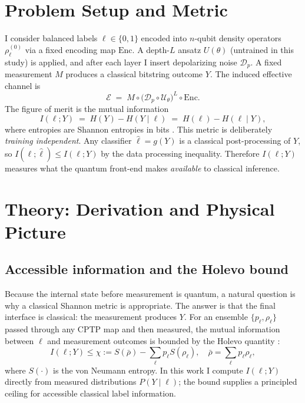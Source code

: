\documentclass[journal]{IEEEtran}
\newcommand{\MI}{I(\ell;Y)}
\begin{document}
\section{Problem Setup and Metric}
I consider balanced labels $\ell\in\{0,1\}$ encoded into $n$-qubit density operators $\rho_\ell^{(0)}$ via a fixed encoding map $\mathrm{Enc}$. A depth-$L$ ansatz $U(\theta)$ (untrained in this study) is applied, and after each layer I insert depolarizing noise $\mathcal{D}_p$. A fixed measurement $M$ produces a classical bitstring outcome $Y$. The induced effective channel is
\begin{equation}
\mathcal{E} \;=\; M \circ \bigl(\mathcal{D}_p\circ\mathcal{U}_\theta\bigr)^L \circ \mathrm{Enc}.
\end{equation}
The figure of merit is the mutual information
\begin{equation}
\MI \;=\; H(Y)-H(Y\mid \ell)
\;=\; H(\ell)-H(\ell\mid Y),
\end{equation}
where entropies are Shannon entropies in bits \cite{ref3}. This metric is deliberately \emph{training independent}. Any classifier $\hat{\ell}=g(Y)$ is a classical post-processing of $Y$, so $I(\ell;\hat{\ell})\le \MI$ by the data processing inequality. Therefore $\MI$ measures what the quantum front-end makes \emph{available} to classical inference.

\section{Theory: Derivation and Physical Picture}
\subsection{Accessible information and the Holevo bound}
Because the internal state before measurement is quantum, a natural question is why a classical Shannon metric is appropriate. The answer is that the final interface is classical: the measurement produces $Y$. For an ensemble $\{p_\ell,\rho_\ell\}$ passed through any CPTP map and then measured, the mutual information between $\ell$ and measurement outcomes is bounded by the Holevo quantity \cite{ref2,ref1}:
\begin{equation}
\MI \le \chi := S(\bar{\rho})-\sum_\ell p_\ell S(\rho_\ell),\quad \bar{\rho}=\sum_\ell p_\ell \rho_\ell,
\end{equation}
where $S(\cdot)$ is the von Neumann entropy. In this work I compute $\MI$ directly from measured distributions $P(Y\mid \ell)$; the bound supplies a principled ceiling for accessible classical label information.
\end{document}
